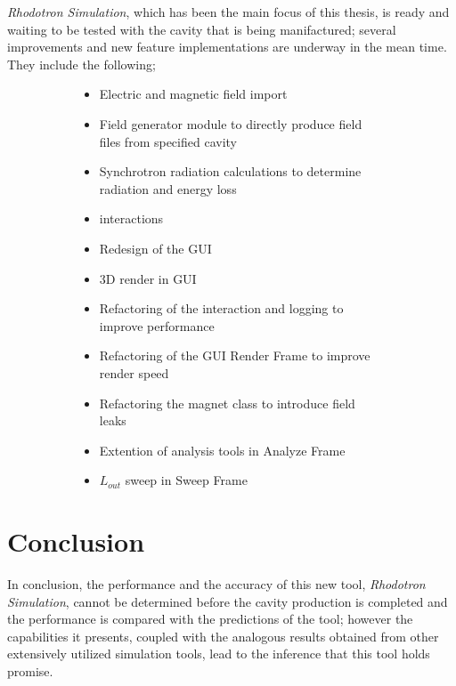 \documentclass[a4paper,oneside,12pt]{report}
\numberwithin{equation}{chapter}
\begin{document}
\textit{Rhodotron Simulation}, which has been the main focus of this thesis, is ready and waiting to be tested with the cavity that is being manifactured; 
several improvements and new feature implementations are underway in the mean time. 
They include the following;
\begin{figure}[H]
    \begin{subfigure}[t]{0.5\textwidth}
        \begin{itemize}
            \item Electric and magnetic field import
            \item Field generator module to directly produce field files from specified cavity
            \item Synchrotron radiation calculations to determine radiation and energy loss
            \item \ee interactions
            \item Redesign of the GUI
            \item 3D render in GUI
        \end{itemize}
    \end{subfigure}
    \begin{subfigure}[t]{0.5\textwidth}
        \begin{itemize}
            \item Refactoring of the \eEM interaction and logging to improve performance
            \item Refactoring of the GUI Render Frame to improve render speed
            \item Refactoring the magnet class to introduce field leaks
            \item Extention of analysis tools in Analyze Frame
            \item $L_{out}$ sweep in Sweep Frame
        \end{itemize}
    \end{subfigure}
\end{figure}

\section{Conclusion}

In conclusion, the performance and the accuracy of this new tool, \textit{Rhodotron Simulation}, cannot be determined
before the cavity production is completed and the performance is compared with the predictions of the tool;
however the capabilities it presents, coupled with the analogous results obtained from other extensively utilized simulation tools, 
lead to the inference that this tool holds promise.
\end{document}
